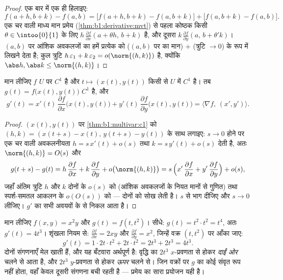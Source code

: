 \begin{proof}
एक बार में एक ही  हिलाइए:
\[
f(a+h, b+k) - f(a,b)
= \bigl[f(a+h, b+k) - f(a, b+k)\bigr] + \bigl[f(a, b+k) -
f(a,b)\bigr].
\]
एक चर वाली माध्य मान प्रमेय (\cref{thm:b1:derivative:mvt}) से पहला कोष्ठक
किसी $\theta \in \intoo{0}{1}$ के लिए $h\,\frac{\partial f}{\partial x}(a +
\theta h,\, b + k)$ है, और दूसरा $k\,\frac{\partial f}{\partial y}(a,\, b +
\theta' k)$। $(a,b)$ पर आंशिक अवकलजों का  हमें प्रत्येक को ($(a,b)$
पर का मान) $+$ (त्रुटि $\to 0$) के रूप में लिखने देता है; कुल त्रुटि
$h\,\varepsilon_1 + k\,\varepsilon_2 = o(\norm{(h,k)})$ है, क्योंकि $\abs
h, \abs k \leq \norm{(h,k)}$।
\end{proof}

\begin{theorem}[शृंखला नियम]\label{thm:b1:multivar:chain}
मान लीजिए $f$ $U$ पर $C^1$ है और $t \mapsto (x(t), y(t))$ किसी  से
$U$ में $C^1$ है। तब $g(t) = f\bigl(x(t), y(t)\bigr)$ $C^1$ है, और
\[
g'(t) = x'(t)\,\frac{\partial f}{\partial x}\bigl(x(t),y(t)\bigr)
+ y'(t)\,\frac{\partial f}{\partial y}\bigl(x(t),y(t)\bigr)
= \bigl\langle \nabla f,\ (x', y')\bigr\rangle .
\]
\end{theorem}

\begin{proof}
$(x(t), y(t))$ पर \cref{thm:b1:multivar:c1} को $(h, k) = (x(t+s) - x(t),\,
y(t+s) - y(t))$ के साथ लगाइए: $s \to 0$ होने पर एक चर वाली अवकलनीयता $h =
s\,x'(t) + o(s)$ तथा $k = s\,y'(t) + o(s)$ देती है, अतः $\norm{(h, k)} =
O(s)$ और
\[
g(t+s) - g(t)
= h\,\frac{\partial f}{\partial x} + k\,\frac{\partial
f}{\partial y} + o\bigl(\norm{(h,k)}\bigr)
= s\,\Bigl(x'\,\frac{\partial f}{\partial x} +
y'\,\frac{\partial f}{\partial y}\Bigr) + o(s) ,
\]
जहाँ अंतिम त्रुटि $h$ और $k$ दोनों के $o(s)$ को (आंशिक अवकलजों के नियत
मानों से गुणित) तथा स्पर्श-समतल आकलन के $o(O(s))$ को --- दोनों को सोख लेती
है। $s$ से भाग दीजिए और $s \to 0$ लीजिए। $g'$ का  सभी अवयवों के
 से निकल आता है।
\end{proof}

\begin{example}[शृंखला नियम, दोनों तरफ़ से जाँचा हुआ]
\label{ex:b1:multivar:chainrun}
मान लीजिए $f(x, y) = x^2 y$ और $g(t) = f(t, t^2)$। सीधे: $g(t) = t^2\cdot
t^2 = t^4$, अतः $g'(t) = 4t^3$। शृंखला नियम से: $\frac{\partial f}{\partial
x} = 2xy$ और $\frac{\partial f}{\partial y} = x^2$, जिन्हें वक्र $(t, t^2)$
पर आँका जाए:
\[
g'(t) = 1\cdot 2t\cdot t^2 + 2t\cdot t^2 = 2t^3 + 2t^3 = 4t^3 .
\]
दोनों संगणनाएँ मेल खाती हैं, और यह बँटवारा अर्थपूर्ण है: वृद्धि का $2t^3$
$x$-प्रवणता से होकर \emph{दाईं ओर} चलने से आता है, और $2t^3$ $y$-प्रवणता
से होकर \emph{ऊपर} चलने से। जिन वक्रों पर $g$ का कोई संवृत रूप नहीं होता,
वहाँ केवल दूसरी संगणना बची रहती है --- प्रमेय का सारा प्रयोजन यही है।
\end{example}

